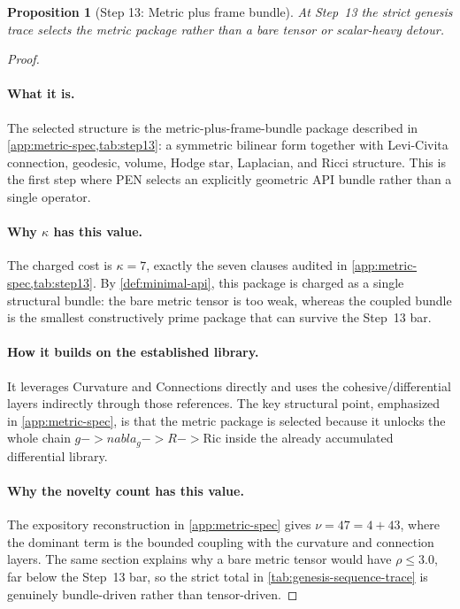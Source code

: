 \documentclass[11pt,a4paper]{article}
\def\to{->}%
\def\nabla{nabla}%
\theoremstyle{plain}
\newtheorem{proposition}[theorem]{Proposition}
\theoremstyle{definition}
\theoremstyle{remark}
\begin{document}
\begin{proposition}[Step 13: Metric plus frame bundle]
\label{prop:genesis-step13}
At Step~13 the strict genesis trace selects the metric package rather than a
bare tensor or scalar-heavy detour.
\end{proposition}

\begin{proof}
\paragraph{What it is.}
The selected structure is the metric-plus-frame-bundle package described in
\cref{app:metric-spec,tab:step13}: a symmetric bilinear form together with
Levi-Civita connection, geodesic, volume, Hodge star, Laplacian, and Ricci
structure.
This is the first step where PEN selects an explicitly geometric API bundle
rather than a single operator.

\paragraph{Why $\kappa$ has this value.}
The charged cost is $\kappa=7$, exactly the seven clauses audited in
\cref{app:metric-spec,tab:step13}.
By \cref{def:minimal-api}, this package is charged as a single structural bundle:
the bare metric tensor is too weak, whereas the coupled bundle is the smallest
constructively prime package that can survive the Step~13 bar.

\paragraph{How it builds on the established library.}
It leverages Curvature and Connections directly and uses the cohesive/differential
layers indirectly through those references.
The key structural point, emphasized in \cref{app:metric-spec}, is that the
metric package is selected because it unlocks the whole chain
$g\to\nabla_g\to R\to\mathrm{Ric}$ inside the already accumulated differential
library.

\paragraph{Why the novelty count has this value.}
The expository reconstruction in \cref{app:metric-spec} gives
$\nu=47=4+43$, where the dominant term is the bounded coupling with the
curvature and connection layers.
The same section explains why a bare metric tensor would have
$\rho\le 3.0$, far below the Step~13 bar, so the strict total in
\cref{tab:genesis-sequence-trace} is genuinely bundle-driven rather than
tensor-driven.


\end{proof}
\end{document}
